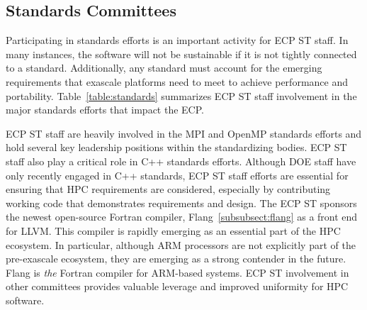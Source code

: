 \subsection{Standards Committees}
Participating in standards efforts is an important activity for ECP ST staff.  In many instances, the software will not be sustainable if it is not tightly connected to a standard. Additionally, any standard must account for the emerging requirements that exascale platforms need to meet to achieve performance and portability. Table~\ref{table:standards} summarizes ECP ST staff involvement in the major standards efforts that impact the ECP.

ECP ST staff are heavily involved in the MPI and OpenMP standards efforts and hold several key leadership positions within the standardizing bodies. ECP ST staff also play a critical role in C++ standards efforts. Although DOE staff have only recently engaged in C++ standards, ECP ST staff efforts are essential for ensuring that HPC requirements are considered, especially by contributing working code that demonstrates requirements and design. The ECP ST sponsors the newest open-source Fortran compiler, Flang~\ref{subsubsect:flang} as a front end for LLVM.  This compiler is rapidly emerging as an essential part of the HPC ecosystem.  In particular, although ARM processors are not explicitly part of the pre-exascale ecosystem, they are emerging as a strong contender in the future.  Flang is \textit{the} Fortran compiler for ARM-based systems.  ECP ST involvement in other committees provides valuable leverage and improved uniformity for HPC software.  

\iffalse %
\begin{figure}[htb]
	\begin{center}
		\texttt{[image: StandardsInvolvement]}
		
		\caption{\label{fig:standards} ECP ST staff are involved in a variety of official and de facto standards committees.  Involvement in standards efforts is essential for ensuring the sustainability of ECT ST products and ensuring that emerging exascale requirements are addressed by these standards.}
	\end{center}
	\todo[inline]{Please convert this figure into a table.}
\end{figure}
\fi

